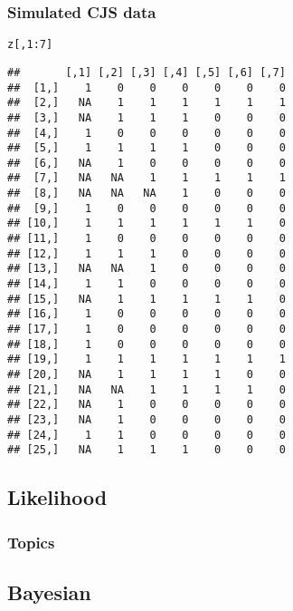 \documentclass[color=usenames,dvipsnames]{beamer}\usepackage[]{graphicx}\usepackage[]{color}
\makeatletter
\newcommand{\hlnum}[1]{\textcolor[rgb]{0.69,0.494,0}{#1}}%
\newcommand{\hlopt}[1]{\textcolor[rgb]{0,0,0}{#1}}%
\newcommand{\hlstd}[1]{\textcolor[rgb]{0,0,0}{#1}}%
\newenvironment{kframe}{%
 \def\at@end@of@kframe{}%
 \ifinner\ifhmode%
  \def\at@end@of@kframe{\end{minipage}}%
  \begin{minipage}{\columnwidth}%
 \fi\fi%
 \def\FrameCommand##1{\hskip\@totalleftmargin \hskip-\fboxsep
 \colorbox{shadecolor}{##1}\hskip-\fboxsep
     \hskip-\linewidth \hskip-\@totalleftmargin \hskip\columnwidth}%
 \MakeFramed {\advance\hsize-\width
   \@totalleftmargin\z@ \linewidth\hsize
   \@setminipage}}%
 {\par\unskip\endMakeFramed%
 \at@end@of@kframe}
\newenvironment{knitrout}{}{} %
\makeatother
\begin{document}
\begin{frame}[fragile]
  \frametitle{Simulated CJS data}
\begin{knitrout}
\color{fgcolor}\begin{kframe}
\begin{alltt}
\hlstd{z[,}\hlnum{1}\hlopt{:}\hlnum{7}\hlstd{]}
\end{alltt}
\begin{verbatim}
##       [,1] [,2] [,3] [,4] [,5] [,6] [,7]
##  [1,]    1    0    0    0    0    0    0
##  [2,]   NA    1    1    1    1    1    1
##  [3,]   NA    1    1    1    0    0    0
##  [4,]    1    0    0    0    0    0    0
##  [5,]    1    1    1    1    0    0    0
##  [6,]   NA    1    0    0    0    0    0
##  [7,]   NA   NA    1    1    1    1    1
##  [8,]   NA   NA   NA    1    0    0    0
##  [9,]    1    0    0    0    0    0    0
## [10,]    1    1    1    1    1    1    0
## [11,]    1    0    0    0    0    0    0
## [12,]    1    1    1    0    0    0    0
## [13,]   NA   NA    1    0    0    0    0
## [14,]    1    1    0    0    0    0    0
## [15,]   NA    1    1    1    1    1    0
## [16,]    1    0    0    0    0    0    0
## [17,]    1    0    0    0    0    0    0
## [18,]    1    0    0    0    0    0    0
## [19,]    1    1    1    1    1    1    1
## [20,]   NA    1    1    1    1    0    0
## [21,]   NA   NA    1    1    1    1    0
## [22,]   NA    1    0    0    0    0    0
## [23,]   NA    1    0    0    0    0    0
## [24,]    1    1    0    0    0    0    0
## [25,]   NA    1    1    1    0    0    0
\end{verbatim}
\end{kframe}
\end{knitrout}
\end{frame}



\subsection{Likelihood}


\begin{frame}[plain]
  \frametitle{Topics}
  \Large
\end{frame}







\subsection{Bayesian}
\end{document}

